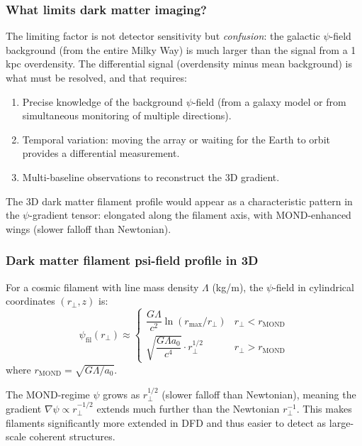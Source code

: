 \documentclass[11pt]{article}
\theoremstyle{definition}
\theoremstyle{remark}
\begin{document}
\subsubsection{What limits dark matter imaging?}

The limiting factor is not detector sensitivity but \emph{confusion}:
the galactic $\psi$-field background (from the entire Milky Way) is
much larger than the signal from a 1\,kpc overdensity. The differential
signal (overdensity minus mean background) is what must be resolved, and
that requires:
\begin{enumerate}
\item Precise knowledge of the background $\psi$-field (from a galaxy
  model or from simultaneous monitoring of multiple directions).
\item Temporal variation: moving the array or waiting for the Earth to
  orbit provides a differential measurement.
\item Multi-baseline observations to reconstruct the 3D gradient.
\end{enumerate}

The 3D dark matter filament profile would appear as a characteristic
pattern in the $\psi$-gradient tensor: elongated along the filament
axis, with MOND-enhanced wings (slower falloff than Newtonian).

\subsubsection{Dark matter filament psi-field profile in 3D}

For a cosmic filament with line mass density $\Lambda$ (kg/m), the
$\psi$-field in cylindrical coordinates $(r_\perp, z)$ is:
\begin{equation}
\psi_{\mathrm{fil}}(r_\perp) \approx
\begin{cases}
\dfrac{G\Lambda}{c^2}\ln(r_{\max}/r_\perp) & r_\perp < r_{\mathrm{MOND}} \\[8pt]
\sqrt{\dfrac{G\Lambda a_0}{c^4}} \cdot r_\perp^{1/2} & r_\perp > r_{\mathrm{MOND}}
\end{cases}
\end{equation}
where $r_{\mathrm{MOND}} = \sqrt{G\Lambda/a_0}$.

The MOND-regime $\psi$ grows as $r_\perp^{1/2}$ (slower falloff than
Newtonian), meaning the gradient $\nabla\psi \propto r_\perp^{-1/2}$
extends much further than the Newtonian $r_\perp^{-1}$. This makes
filaments significantly more extended in DFD and thus easier to detect
as large-scale coherent structures.
\end{document}
